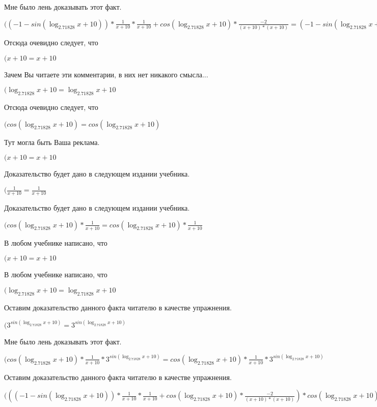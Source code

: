 \documentclass[12pt,a4paper,fleqn]{article}
\theoremstyle{definition}
\begin{document}
Мне было лень доказывать этот факт.

$(( -1  - sin(\log_{ 2.71828 }{ x  +  10 })) * \frac{ 1 }{ x  +  10 }
 * \frac{ 1 }{ x  +  10 }
 + cos(\log_{ 2.71828 }{ x  +  10 }) * \frac{ -2 }{( x  +  10 ) * ( x  +  10 )}
 = ( -1  - sin(\log_{ 2.71828 }{ x  +  10 })) * \frac{ 1 }{ x  +  10 }
 * \frac{ 1 }{ x  +  10 }
 + cos(\log_{ 2.71828 }{ x  +  10 }) * \frac{ -2 }{( x  +  10 ) * ( x  +  10 )}
$

Отсюда очевидно следует, что

$( x  +  10  =  x  +  10 $

Зачем Вы читаете эти комментарии, в них нет никакого смысла...

$(\log_{ 2.71828 }{ x  +  10 } = \log_{ 2.71828 }{ x  +  10 }$

Отсюда очевидно следует, что

$(cos(\log_{ 2.71828 }{ x  +  10 }) = cos(\log_{ 2.71828 }{ x  +  10 })$

Тут могла быть Ваша реклама.

$( x  +  10  =  x  +  10 $

Доказательство будет дано в следующем издании учебника.

$(\frac{ 1 }{ x  +  10 }
 = \frac{ 1 }{ x  +  10 }
$

Доказательство будет дано в следующем издании учебника.

$(cos(\log_{ 2.71828 }{ x  +  10 }) * \frac{ 1 }{ x  +  10 }
 = cos(\log_{ 2.71828 }{ x  +  10 }) * \frac{ 1 }{ x  +  10 }
$

В любом учебнике написано, что

$( x  +  10  =  x  +  10 $

В любом учебнике написано, что

$(\log_{ 2.71828 }{ x  +  10 } = \log_{ 2.71828 }{ x  +  10 }$

Оставим доказательство данного факта читателю в качестве упражнения.

$({ 3 }^{sin(\log_{ 2.71828 }{ x  +  10 })} = { 3 }^{sin(\log_{ 2.71828 }{ x  +  10 })}$

Мне было лень доказывать этот факт.

$(cos(\log_{ 2.71828 }{ x  +  10 }) * \frac{ 1 }{ x  +  10 }
 * { 3 }^{sin(\log_{ 2.71828 }{ x  +  10 })} = cos(\log_{ 2.71828 }{ x  +  10 }) * \frac{ 1 }{ x  +  10 }
 * { 3 }^{sin(\log_{ 2.71828 }{ x  +  10 })}$

Оставим доказательство данного факта читателю в качестве упражнения.

$((( -1  - sin(\log_{ 2.71828 }{ x  +  10 })) * \frac{ 1 }{ x  +  10 }
 * \frac{ 1 }{ x  +  10 }
 + cos(\log_{ 2.71828 }{ x  +  10 }) * \frac{ -2 }{( x  +  10 ) * ( x  +  10 )}
) * cos(\log_{ 2.71828 }{ x  +  10 }) * \frac{ 1 }{ x  +  10 }
 * { 3 }^{sin(\log_{ 2.71828 }{ x  +  10 })} = (( -1  - sin(\log_{ 2.71828 }{ x  +  10 })) * \frac{ 1 }{ x  +  10 }
 * \frac{ 1 }{ x  +  10 }
 + cos(\log_{ 2.71828 }{ x  +  10 }) * \frac{ -2 }{( x  +  10 ) * ( x  +  10 )}
) * cos(\log_{ 2.71828 }{ x  +  10 }) * \frac{ 1 }{ x  +  10 }
 * { 3 }^{sin(\log_{ 2.71828 }{ x  +  10 })}$
\end{document}
